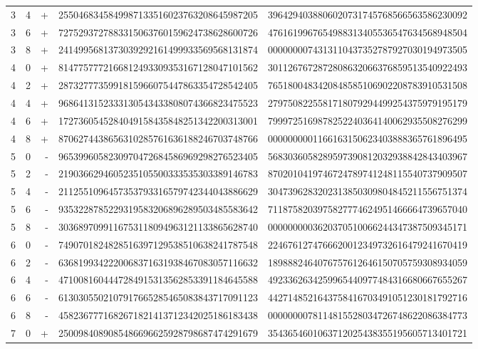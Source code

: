 \begin{longtable}{rrrll}
3 & 4 & + & 2550468345849987133516023763208645987205 & 3964294038806020731745768566563586230092 \\
3 & 6 & + & 7275293727883315063760159624738628600726 & 4761619967654988313405536547634568948504 \\
3 & 8 & + & 2414995681373039292161499933569568131874 & 0000000074313110437352787927030194973505 \\
4 & 0 & + & 8147757772166812493309353167128047101562 & 3011267672872808632066376859513540922493 \\
4 & 2 & + & 2873277735991815966075447863354728542405 & 7651800483420848585106902208783910531508 \\
4 & 4 & + & 9686413152333130543433808074366823475523 & 2797508225581718079294499254375979195179 \\
4 & 6 & + & 1727360545284049158435848251342200313001 & 7999725169878252240364140062935508276299 \\
4 & 8 & + & 8706274438656310285761636188246703748766 & 0000000001166163150623403888365761896495 \\
5 & 0 & - & 9653996058230970472684586969298276523405 & 5683036058289597390812032938842843403967 \\
5 & 2 & - & 2190366294605235105500333535303389146783 & 8702010419746724789741248115540737909507 \\
5 & 4 & - & 2112551096457353793316579742344043886629 & 3047396283202313850309804845211556751374 \\
5 & 6 & - & 9353228785229319583206896289503485583642 & 7118758203975827774624951466664739657040 \\
5 & 8 & - & 3036897099116753118094963121133865628740 & 0000000003620370510066244347387509345171 \\
6 & 0 & - & 7490701824828516397129538510638241787548 & 2246761274766620012349732616479241670419 \\
6 & 2 & - & 6368199342220068371631938467083057116632 & 1898882464076757612646150705759308934059 \\
6 & 4 & - & 4710081604447284915313562853391184645588 & 4923362634259965440977484316680667655267 \\
6 & 6 & - & 6130305502107917665285465083843717091123 & 4427148521643758416703491051230181792716 \\
6 & 8 & - & 4582367771682671821413712342025186183438 & 0000000078114815528034726748622086384773 \\
7 & 0 & + & 2500984089085486696625928798687474291679 & 3543654601063712025438355195605713401721 \\

\end{longtable}
